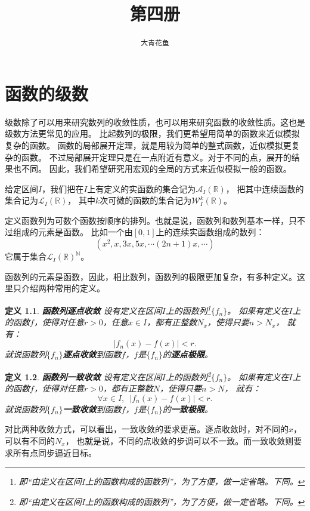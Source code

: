 \documentclass[12pt,UTF8]{ctexbook}
\title{\zihao{0} \bfseries 第四册}
\author{\zihao{2} \texttt{大青花鱼}}
\date{}
\newtheorem{df}{定义}[section]
\begin{document}
\maketitle
\tableofcontents
\newpage

\chapter{函数的级数}

级数除了可以用来研究数列的收敛性质，也可以用来研究函数的收敛性质。这也是级数方法更常见的应用。
比起数列的极限，我们更希望用简单的函数来近似模拟复杂的函数。
函数的局部展开定理，就是用较为简单的整式函数，近似模拟更复杂的函数。
不过局部展开定理只是在一点附近有意义。对于不同的点，展开的结果也不同。
因此，我们希望研究用宏观的全局的方式来近似模拟一般的函数。

给定区间$I$，我们把在$I$上有定义的实函数的集合记为$\mathcal{A}_I(\mathbb{R})$，
把其中连续函数的集合记为$\mathcal{L}_I(\mathbb{R})$，
其中$k$次可微的函数的集合记为$\mathcal{W}_I^k(\mathbb{R})$。

定义函数列为可数个函数按顺序的排列。也就是说，函数列和数列基本一样，只不过组成的元素是函数。
比如一个由$[0,1]$上的连续实函数组成的数列：
$$ (x^2, x, 3x, 5x, \cdots (2n+1)x, \cdots )$$
它属于集合$\mathcal{L}_I(\mathbb{R})^{\mathbb{N}}$。

函数列的元素是函数，因此，相比数列，函数列的极限更加复杂，有多种定义。这里只介绍两种常用的定义。
\begin{df}{\textbf{函数列逐点收敛}}
    设有定义在区间$I$上的函数列\footnote{即“由定义在区间$I$上的函数构成的函数列”，为了方便，做一定省略。下同。}$\{f_n\}$。
    如果有定义在$I$上的函数$f$，使得对任意$r>0$，任意$x\in I$，都有正整数$N_x$，使得只要$n>N_x$，
    就有：
    $$ |f_n(x) - f(x) | < r.$$
    就说函数列$\{f_n\}$\textbf{逐点收敛}到函数$f$，$f$是$\{f_n\}$的\textbf{逐点极限}。
\end{df}

\begin{df}{\textbf{函数列一致收敛}}
    设有定义在区间$I$上的函数列\footnote{即“由定义在区间$I$上的函数构成的函数列”，为了方便，做一定省略。下同。}$\{f_n\}$。
    如果有定义在$I$上的函数$f$，使得对任意$r>0$，都有正整数$N$，使得只要$n>N$，
    就有：
    $$ \forall x\in I, \,\,\,|f_n(x) - f(x) | < r.$$
    就说函数列$\{f_n\}$\textbf{一致收敛}到函数$f$，$f$是$\{f_n\}$的\textbf{一致极限}。
\end{df}

对比两种收敛方式，可以看出，一致收敛的要求更高。逐点收敛时，对不同的$x$，可以有不同的$N_x$，
也就是说，不同的点收敛的步调可以不一致。而一致收敛则要求所有点同步逼近目标。
\end{document}
